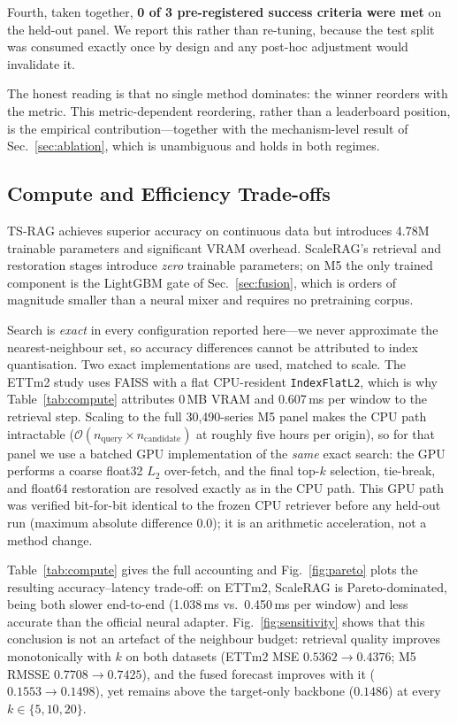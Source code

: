\documentclass[twocolumn]{svjour3}          %
\begin{document}
Fourth, taken together, \textbf{0 of 3 pre-registered success criteria were met} on the held-out panel. We report this rather than re-tuning, because the test split was consumed exactly once by design and any post-hoc adjustment would invalidate it.

The honest reading is that no single method dominates: the winner reorders with the metric. This metric-dependent reordering, rather than a leaderboard position, is the empirical contribution---together with the mechanism-level result of Sec.~\ref{sec:ablation}, which is unambiguous and holds in both regimes.

\subsection{Compute and Efficiency Trade-offs}
\label{sec:compute}
TS-RAG achieves superior accuracy on continuous data but introduces 4.78M trainable parameters and significant VRAM overhead. ScaleRAG's retrieval and restoration stages introduce \emph{zero} trainable parameters; on M5 the only trained component is the LightGBM gate of Sec.~\ref{sec:fusion}, which is orders of magnitude smaller than a neural mixer and requires no pretraining corpus.

Search is \emph{exact} in every configuration reported here---we never approximate the nearest-neighbour set, so accuracy differences cannot be attributed to index quantisation. Two exact implementations are used, matched to scale. The ETTm2 study uses FAISS with a flat CPU-resident \texttt{IndexFlatL2}, which is why Table~\ref{tab:compute} attributes 0\,MB VRAM and 0.607\,ms per window to the retrieval step. Scaling to the full 30,490-series M5 panel makes the CPU path intractable ($\mathcal{O}(n_{\text{query}} \times n_{\text{candidate}})$ at roughly five hours per origin), so for that panel we use a batched GPU implementation of the \emph{same} exact search: the GPU performs a coarse float32 $L_2$ over-fetch, and the final top-$k$ selection, tie-break, and float64 restoration are resolved exactly as in the CPU path. This GPU path was verified bit-for-bit identical to the frozen CPU retriever before any held-out run (maximum absolute difference 0.0); it is an arithmetic acceleration, not a method change.

Table~\ref{tab:compute} gives the full accounting and Fig.~\ref{fig:pareto} plots the resulting accuracy--latency trade-off: on ETTm2, ScaleRAG is Pareto-dominated, being both slower end-to-end (1.038\,ms vs.\ 0.450\,ms per window) and less accurate than the official neural adapter. Fig.~\ref{fig:sensitivity} shows that this conclusion is not an artefact of the neighbour budget: retrieval quality improves monotonically with $k$ on both datasets (ETTm2 MSE $0.5362 \to 0.4376$; M5 RMSSE $0.7708 \to 0.7425$), and the fused forecast improves with it ($0.1553 \to 0.1498$), yet remains above the target-only backbone ($0.1486$) at every $k \in \{5, 10, 20\}$.
\end{document}
